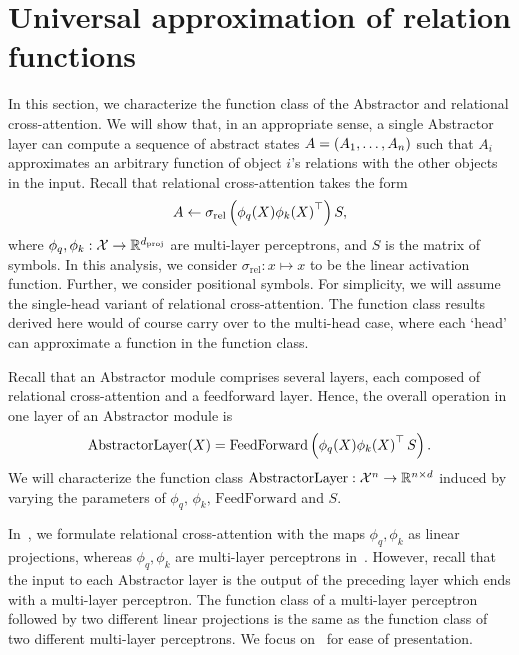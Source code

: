 \section{Universal approximation of relation functions}\label{sec:abstractor_approx_theory}

In this section, we characterize the function class of the Abstractor and relational cross-attention. We will show that, in an appropriate sense, a single Abstractor layer can compute a sequence of abstract states $A = (A_1, \ldots, A_n)$ such that $A_i$ approximates an arbitrary function of object $i$'s relations with the other objects in the input. Recall that relational cross-attention takes the form
\begin{equation*}
    A \gets \sigma_{\mathrm{rel}}\left(\phi_q(X) {\phi_k(X)}^\top\right) S,
\end{equation*}
where $\phi_q, \phi_k: {\mathcal{X}} \to \mathbb{R}^{d_{\mathrm{proj}}}$ are multi-layer perceptrons, and $S$ is the matrix of symbols. In this analysis, we consider $\sigma_{\mathrm{rel}}: x \mapsto x$ to be the linear activation function. Further, we consider positional symbols. For simplicity, we will assume the single-head variant of relational cross-attention. The function class results derived here would of course carry over to the multi-head case, where each `head' can approximate a function in the function class.

Recall that an Abstractor module comprises several layers, each composed of relational cross-attention and a feedforward layer. Hence, the overall operation in one layer of an Abstractor module is
\begin{equation}\label{eq:abstractor_layer}
    \mathrm{AbstractorLayer}(X) = \mathrm{FeedForward}\left(\phi_q(X) {\phi_k(X)}^\top \, S\right).
\end{equation}
We will characterize the function class $\mathrm{AbstractorLayer}: {\mathcal{X}}^n \to \mathbb{R}^{n \times d}$ induced by varying the parameters of $\phi_q,\, \phi_k,\, \mathrm{FeedForward}$ and $S$.

\begin{remark}
    In~, we formulate relational cross-attention with the maps $\phi_q, \phi_k$ as linear projections, whereas $\phi_q, \phi_k$ are multi-layer perceptrons in~. However, recall that the input to each Abstractor layer is the output of the preceding layer which ends with a multi-layer perceptron. The function class of a multi-layer perceptron followed by two different linear projections is the same as the function class of two different multi-layer perceptrons. We focus on~ for ease of presentation.
\end{remark}

